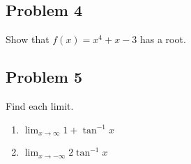 \documentclass[10pt]{book}
\theoremstyle{definition}
\begin{document}
\subsection*{Problem 4} Show that $f(x)=x^4+x-3$ has a root.\vspace{5cm}
\subsection*{Problem 5}
Find each limit.
\begin{enumerate}[label=(\alph*)]
    \item $\displaystyle\lim_{x\rightarrow\infty}1+\tan^{-1}x$\vspace{2cm}
    \item $\displaystyle\lim_{x\rightarrow-\infty}2\tan^{-1}x$
\end{enumerate}
\end{document}
